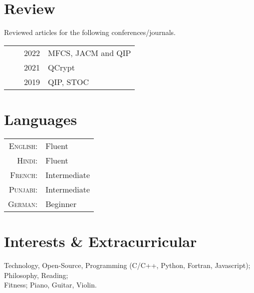 \documentclass[a4paper,10pt]{article}
\begin{document}
  \section{Review}
  Reviewed articles for the following conferences/journals.\\
  \begin{tabular}{rrp{11cm}}
    & ~~2022 & MFCS, JACM and QIP\\
    & ~~2021 & QCrypt\\
    & ~~2019 & QIP, STOC\\
    \end{tabular}
  


\section{Languages}
\begin{tabular}{rl}
\textsc{English:}&Fluent\\
\textsc{Hindi:}&Fluent\\
\textsc{French:}&Intermediate\\
\textsc{Punjabi:}&Intermediate\\
\textsc{German:}&Beginner\\
\end{tabular}



\section{Interests \& Extracurricular}
Technology, Open-Source, Programming (C/C++, Python, Fortran, Javascript);\\ 
Philosophy, Reading; \\
Fitness; Piano, Guitar, Violin.
\end{document}
